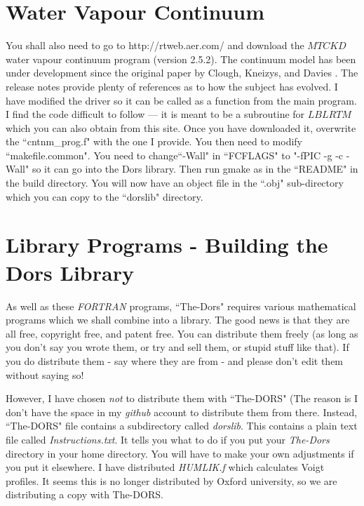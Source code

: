 \documentclass[12pt]{article}
\begin{document}
\section{Water Vapour Continuum}

You shall also need to go to http://rtweb.aer.com/ and download the $MT CKD$ water vapour continuum program (version 2.5.2). The continuum model has been under development since the original paper by Clough, Kneizys, and Davies \cite{MTCKD:Mybib}. The release notes provide plenty of references as to how the subject has evolved. I have modified the driver so it can be called
as a function from the main program. I find the code difficult to follow --- it is meant to be a subroutine for $LBLRTM$
which you can also obtain from this site. Once you have downloaded it, overwrite the ``cntnm\_prog.f"  with the one I provide.
You then need to modify ``makefile.common". You need to change``-Wall" in ``FCFLAGS"  to "-fPIC -g -c -Wall" so it can go into the Dors library. Then run gmake as in the ``README" in the build directory. You will now have an object file in the ``.obj"
 sub-directory which you can copy to the ``dorslib" directory.


\section{Library Programs - Building the Dors Library}

As well as these {\it FORTRAN} programs, ``The-Dors" requires various mathematical programs which we shall
 combine into a library. The good news is
that they are all free, copyright free, and patent free. You can distribute them freely (as long as you don't say you wrote
 them, or try and sell them,  or stupid stuff like that). If you do distribute them - say where they are from - and please don't edit them without saying so!  

However, I have chosen {\it not} to distribute
them with ``The-DORS" (The reason is I don't have the space in my {\it github} account to distribute
them from there.  Instead, ``The-DORS" file contains a subdirectory called  {\it dorslib}.
This contains a plain text file called {\it Instructions.txt}. It tells you what to do if you put your {\it The-Dors}
directory in your home directory. You will have to make your own adjustments if you put it elsewhere.
I have distributed {\it HUMLIK.f} \cite{BobWells:MyBib} which calculates Voigt profiles. It seems this is no longer
distributed by Oxford university, so we are distributing a copy with The-DORS.
\end{document}
